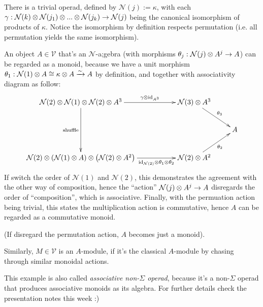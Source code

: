 \documentclass{article}
\begin{document}
\begin{exmp}
    There is a trivial operad, defined by $\mathcal{N}(j):=\kappa$, with each $\gamma:\mathcal{N}(k)\otimes \mathcal{N}(j_1)\otimes...\otimes\mathcal{N}(j_k)\rightarrow\mathcal{N}(j)$ being the canonical isomorphism of products of $\kappa$. Notice the isomorphism by definition respects permutation (i.e. all permutation yields the same isomorphism).

    An object $A\in\mathcal{V}$ that's an $\mathcal{N}$-a;gebra (with morphisms $\theta_j:\mathcal{N}(j)\otimes A^{j}\rightarrow A$) can be regarded as a monoid, because we have a unit morphism $\theta_1:\mathcal{N}(1)\otimes A\cong \kappa\otimes A\xrightarrow{\sim}A$ by definition, and together with associativity diagram as follow:
    \[\xymatrix{
        \mathcal{N}(2)\tensor \mathcal{N}(1)\tensor\mathcal{N}(2)\tensor A^3\ar[dd]_-{\text{shuffle}}\ar[rr]^-{\gamma\tensor \id_{A^3}} && \mathcal{N}(3)\tensor A^3 \ar[dr]^-{\theta_3}\\
        &&& A\\
        \mathcal{N}(2)\tensor \left(\mathcal{N}(1)\tensor A\right)\tensor \left(\mathcal{N}(2)\tensor A^2\right) \ar[rr]_-{\id_{\mathcal{N}(2)}\tensor \theta_1\tensor\theta_2} && \mathcal{N}(2)\tensor A^2 \ar[ur]_-{\theta_2}
    }\]
    If switch the order of $\mathcal{N}(1)$ and $\mathcal{N}(2)$, this demonstrates the agreement with the other way of composition, hence the ``action'' $\mathcal{N}(j)\otimes A^j\rightarrow A$ disregards the order of ``composition'', which is associative. Finally, with the permuation action being trivial, this states the multiplication action is commutative, hence $A$ can be regarded as a commutative monoid.

    (If disregard the permutation action, $A$ becomes just a monoid).

    Similarly, $M\in\mathcal{V}$ is an $A$-module, if it's the classical $A$-module by chasing through similar monoidal actions.
\end{exmp}

This example is also called \emph{associative non-$\Sigma$ operad}, because it's a non-$\Sigma$ operad that produces associative monoids as its algebra. For further details check the presentation notes this week :)
\end{document}
